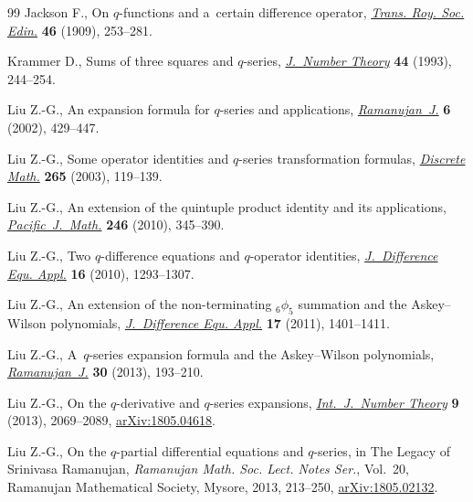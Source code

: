 \documentclass[pdftex]{sigma}
\numberwithin{equation}{section}
\begin{document}
\begin{thebibliography}{99}
Jackson F., On $q$-functions and a~certain difference operator, \href{https://doi.org/10.1017/S0080456800002751}{\textit{Trans.
 Roy. Soc. Edin.}} \textbf{46} (1909), 253--281.

Krammer D., Sums of three squares and {$q$}-series, \href{https://doi.org/10.1006/jnth.1993.1050}{\textit{J.~Number Theory}}
 \textbf{44} (1993), 244--254.

Liu Z.-G., An expansion formula for {$q$}-series and applications,
 \href{https://doi.org/10.1023/A:1021306016666}{\textit{Ramanujan~J.}} \textbf{6} (2002), 429--447.

Liu Z.-G., Some operator identities and {$q$}-series transformation formulas,
 \href{https://doi.org/10.1016/S0012-365X(02)00626-X}{\textit{Discrete Math.}} \textbf{265} (2003), 119--139.

Liu Z.-G., An extension of the quintuple product identity and its applications,
 \href{https://doi.org/10.2140/pjm.2010.246.345}{\textit{Pacific~J.~Math.}} \textbf{246} (2010), 345--390.

Liu Z.-G., Two {$q$}-difference equations and {$q$}-operator identities,
 \href{https://doi.org/10.1080/10236190902810385}{\textit{J.~Difference Equ. Appl.}} \textbf{16} (2010), 1293--1307.

Liu Z.-G., An extension of the non-terminating {${}_6\phi_5$} summation and the
 {A}skey--{W}ilson polynomials, \href{https://doi.org/10.1080/10236190903530735}{\textit{J.~Difference Equ. Appl.}} \textbf{17}
 (2011), 1401--1411.

Liu Z.-G., A~{$q$}-series expansion formula and the {A}skey--{W}ilson
 polynomials, \href{https://doi.org/10.1007/s11139-012-9450-2}{\textit{Ramanujan~J.}} \textbf{30} (2013), 193--210.

Liu Z.-G., On the {$q$}-derivative and {$q$}-series expansions,
 \href{https://doi.org/10.1142/S1793042113500759}{\textit{Int.~J.~Number Theory}} \textbf{9} (2013), 2069--2089,
 \href{https://arxiv.org/abs/1805.04618}{arXiv:1805.04618}.

Liu Z.-G., On the {$q$}-partial differential equations and {$q$}-series, in The
 Legacy of {S}rinivasa {R}amanujan, \textit{Ramanujan Math. Soc. Lect. Notes
 Ser.}, Vol.~20, Ramanujan Mathematical Society, Mysore, 2013, 213--250,
 \href{https://arxiv.org/abs/1805.02132}{arXiv:1805.02132}.


\end{thebibliography}
\end{document}
